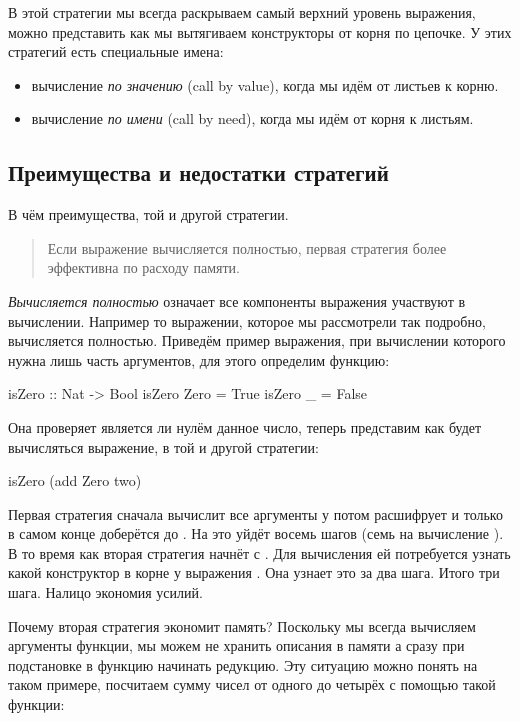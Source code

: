 В этой стратегии мы всегда раскрываем самый верхний уровень
выражения, можно представить как мы вытягиваем конструкторы
от корня по цепочке. У этих стратегий есть специальные имена:

\begin{itemize}
\item вычисление \emph{по значению} (call by value), когда 
    мы идём от листьев к корню.

\item вычисление \emph{по имени} (call by need), когда
    мы идём от корня к листьям.
\end{itemize}

\subsection{Преимущества и недостатки стратегий}

В чём преимущества, той и другой стратегии. 

\begin{quote}
Если выражение вычисляется полностью, первая стратегия
более эффективна по расходу памяти.
\end{quote}

\emph{Вычисляется полностью} означает все компоненты
выражения участвуют в вычислении. Например то выражении,
которое мы рассмотрели так подробно, вычисляется полностью.
Приведём пример выражения, при вычислении которого нужна лишь
часть аргументов, для этого определим функцию: 

\begin{code}
isZero :: Nat -> Bool
isZero Zero     = True
isZero _        = False
\end{code}

Она проверяет является ли нулём данное число, теперь представим
как будет вычисляться выражение, в той и другой стратегии:

\begin{code}
isZero (add Zero two)
\end{code}

Первая стратегия сначала вычислит все аргументы у 
потом расшифрует  и только в самом конце доберётся 
до . На это уйдёт восемь шагов (семь 
на вычисление ).
В то время как вторая стратегия начнёт с . 
Для вычисления  ей потребуется узнать какой конструктор в корне у
выражения . Она узнает это за два шага. 
Итого три шага. Налицо экономия усилий. 

Почему вторая стратегия экономит память? Поскольку мы всегда
вычисляем аргументы функции, мы можем не хранить описания
в памяти а сразу при подстановке в функцию начинать редукцию.
Эту ситуацию можно понять на таком примере, посчитаем сумму чисел
от одного до четырёх с помощью такой функции:

